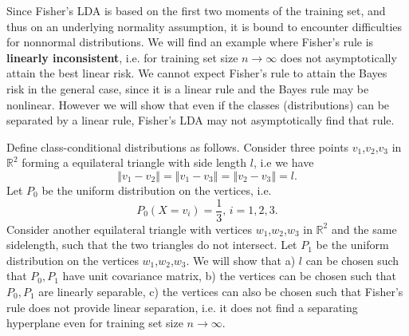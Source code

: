 \documentclass[11pt,twoside]{article}%
\theoremstyle{change}
\begin{document}
Since Fisher's LDA is based on the first two moments of the training set, and
thus on an underlying normality assumption, it is bound to encounter
difficulties for nonnormal distributions. We will find an example where
Fisher's rule is \textbf{linearly inconsistent}, i.e. for training set size
$n\rightarrow\infty$ does not asymptotically attain the best linear risk. We
cannot expect Fisher's rule to attain the Bayes risk in the general case,
since it is a linear rule and the Bayes rule may be nonlinear. However we will
show that even if the classes (distributions) can be separated by a linear
rule, Fisher's LDA may not asymptotically find that rule.

Define class-conditional distributions as follows. Consider three points
$v_{1}$,$v_{2}$,$v_{3}$ in $\mathbb{R}^{2}$ forming a equilateral triangle
with side length $l$, i.e we have
\[
\left\Vert v_{1}-v_{2}\right\Vert =\left\Vert v_{1}-v_{3}\right\Vert
=\left\Vert v_{2}-v_{3}\right\Vert =l.
\]
Let $P_{0}$ be the uniform distribution on the vertices, i.e.
\[
P_{0}\left(  X=v_{i}\right)  =\frac{1}{3}\text{, }i=1,2,3.
\]
Consider another equilateral triangle with vertices $w_{1}$,$w_{2}$,$w_{3}$ in
$\mathbb{R}^{2}$ and the same sidelength, such that the two triangles do not
intersect. Let $P_{1}$ be the uniform distribution on the vertices $w_{1}
$,$w_{2}$,$w_{3}$. We will show that a) $l$ can be chosen such that
$P_{0},P_{1}$ have unit covariance matrix, b) the vertices can be chosen such
that $P_{0},P_{1}$ are linearly separable, c) the vertices can also be chosen
such that Fisher's rule does not provide linear separation, i.e. it does not
find a separating hyperplane even for training set size $n\rightarrow\infty$.

\bigskip
\end{document}

